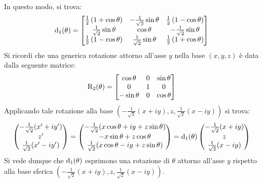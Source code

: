 In questo modo, si trova:
\begin{equation*}
	\mathrm{d}_1(\theta) =
	\begin{bmatrix}
		\frac{1}{2} \left( 1 + \cos \theta \right) & - \frac{1}{\sqrt{2}} \sin \theta & \frac{1}{2} \left( 1 - \cos \theta \right) \\
		\frac{1}{\sqrt{2}} \sin \theta & \cos \theta & - \frac{1}{\sqrt{2}} \sin \theta \\
		\frac{1}{2} \left( 1 - \cos \theta \right) & \frac{1}{\sqrt{2}} \sin \theta & \frac{1}{2} \left( 1 + \cos \theta \right)
	\end{bmatrix}
\end{equation*}
Si ricordi che una generica rotazione attorno all'asse $ y $ nella base $ (x,y,z) $ è data dalla seguente matrice:
\begin{equation*}
	\mathrm{R}_2(\theta) =
	\begin{bmatrix}
		\cos \theta & 0 & \sin \theta \\
		0 & 1 & 0 \\
		-\sin \theta & 0 & \cos \theta
	\end{bmatrix}
\end{equation*}
Applicando tale rotazione alla base $ (-\frac{1}{\sqrt{2}} (x + iy), z, \frac{1}{\sqrt{2}} (x - iy)) $ si trova:
\begin{equation*}
	\begin{pmatrix}
		-\frac{1}{\sqrt{2}} (x' + iy') \\
		z' \\
		\frac{1}{\sqrt{2}} (x' - iy')
	\end{pmatrix}
	=
	\begin{pmatrix}
		- \frac{1}{\sqrt{2}} (x \cos \theta + iy + z \sin \theta) \\
		- x \sin \theta + z \cos \theta \\
		\frac{1}{\sqrt{2}} (x \cos \theta - iy + z \sin \theta)
	\end{pmatrix}
	=
	\mathrm{d}_1(\theta)
	\begin{pmatrix}
		-\frac{1}{\sqrt{2}} (x + iy) \\
		z \\
		\frac{1}{\sqrt{2}} (x - iy)
	\end{pmatrix}
\end{equation*}
Si vede dunque che $ \mathrm{d}_1(\theta) $ esprimono una rotazione di $ \theta $ attorno all'asse $ y $ rispetto alla base sferica $ (-\frac{1}{\sqrt{2}} (x + iy), z, \frac{1}{\sqrt{2}} (x - iy)) $.










